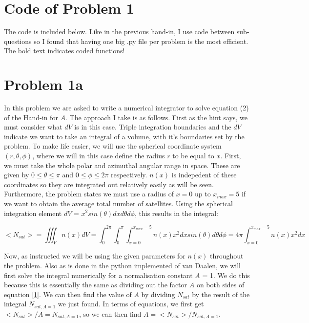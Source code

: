 \section*{Code of Problem 1}

The code is included below. Like in the previous hand-in, I use code between sub-questions so I found that having one big .py file per problem is the most efficient. The bold text indicates coded functions! 



\section*{Problem 1a}

In this problem we are asked to write a numerical integrator to solve equation (2) of the Hand-in for $A$. The approach I take is as follows. First as the hint says, we must consider what $dV$ is in this case. Triple integration boundaries and the $dV$ indicate we want to take an integral of a volume, with it's boundaries set by the problem. To make life easier, we will use the spherical coordinate system $(r,\theta,\phi)$, where we will in this case define the radius $r$ to be equal to $x$. First, we must take the whole polar and azimuthal angular range in space. These are given by $0 \le \theta \le \pi$ and $0 \le \phi \le 2\pi$ respectively. $n(x)$ is indepedent of these coordinates so they are integrated out relatively easily as will be seen. Furthermore, the problem states we must use a radius of $x = 0$ up to $x_{max} = 5$ if we want to obtain the average total number of satellites. Using the spherical integration element $dV$ = $x^2 sin(\theta)dxd\theta d\phi$, this results in the integral:

\begin{equation}	
	<N_{sat}> = \iiint_{V} n(x)dV = \int_0^{2\pi} \int_0^{\pi} \int_{x=0}^{x_{max}=5} n(x) x^2 dx sin(\theta)d\theta d\phi = 4\pi  \int_{x=0}^{x_{max}=5} n(x) x^2 dx
	\label{1}
\end{equation}

Now, as instructed we will be using the given parameters for $n(x)$ throughout the problem. Also as is done in the python implemented of van Daalen, we will first solve the integral numerically for a normalisation constant $A$ = 1. We do this because this is essentially the same as dividing out the factor $A$ on both sides of equation \ref{1}. We can then find the value of $A$ by dividing $N_{sat}$ by the result of the integral $N_{sat,A=1}$ we just found. In terms of equations, we first get $<N_{sat}>/A = N_{sat,A=1}$, so we can then find $A =<N_{sat}>/ N_{sat,A=1}$.\\

